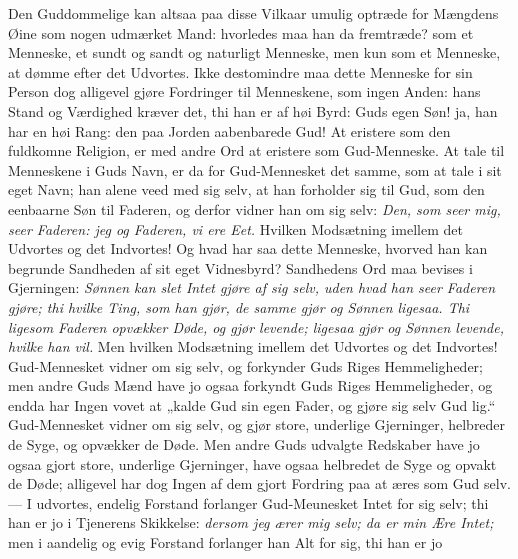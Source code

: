 \documentclass[12pt,a4paper]{book}
\begin{document}
Den Guddommelige kan altsaa paa disse Vilkaar umulig optræde for Mængdens Øine som
nogen udmærket Mand: hvorledes maa han da fremtræde? som et Menneske, et sundt og sandt
og naturligt Menneske, men kun som et Menneske, at dømme efter det Udvortes. Ikke
destomindre maa dette Menneske for sin Person dog alligevel gjøre Fordringer til
Menneskene, som ingen Anden: hans Stand og Værdighed kræver det, thi han er af høi
Byrd: Guds egen Søn! ja, han har en høi Rang: den paa Jorden aabenbarede Gud! At
eristere som den fuldkomne Religion, er med andre Ord at eristere som Gud-Menneske. At
tale til Menneskene i Guds Navn, er da for Gud-Mennesket det samme, som at tale i sit
eget Navn; han alene veed med sig selv, at han forholder sig til Gud, som den eenbaarne
Søn til Faderen, og derfor vidner han om sig selv: \emph{Den, som seer mig, seer
Faderen: jeg og Faderen, vi ere Eet.} Hvilken Modsætning imellem det Udvortes og det
Indvortes! Og hvad har saa dette Menneske, hvorved han kan begrunde Sandheden af sit
eget Vidnesbyrd? Sandhedens Ord maa bevises i Gjerningen: \emph{Sønnen kan slet Intet
gjøre af sig selv, uden hvad han seer Faderen gjøre; thi hvilke Ting, som han gjør, de
samme gjør og Sønnen ligesaa. Thi ligesom Faderen opvækker Døde, og gjør levende;
ligesaa gjør og Sønnen levende, hvilke han vil.} Men hvilken Modsætning imellem det
Udvortes og det Indvortes! Gud-Mennesket vidner om sig selv, og forkynder Guds Riges
Hemmeligheder; men andre Guds Mænd have jo ogsaa forkyndt Guds Riges Hemmeligheder, og
endda har Ingen
vovet at „kalde Gud sin egen Fader, og gjøre sig selv Gud lig.“ Gud-Mennesket vidner om
sig selv, og gjør store, underlige Gjerninger, helbreder de Syge, og opvækker de Døde.
Men andre Guds udvalgte Redskaber have jo ogsaa gjort store, underlige Gjerninger, have
ogsaa helbredet de Syge og opvakt de Døde; alligevel har dog Ingen af dem gjort Fordring
paa at æres som Gud selv. --- I udvortes, endelig Forstand forlanger Gud-Meunesket Intet
for sig selv; thi han er jo i Tjenerens Skikkelse: \emph{dersom jeg ærer mig selv; da er
min Ære Intet;} men i aandelig og evig Forstand forlanger han Alt for sig, thi han er jo
\end{document}

